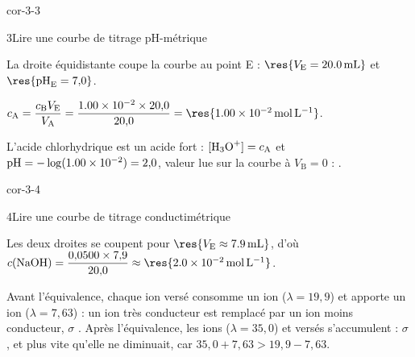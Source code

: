 \begin{blocLivre}{cor-3-3}
\begin{corrige}{3}{Lire une courbe de titrage pH-métrique}
\begin{questions}
\item La droite équidistante coupe la courbe au point E : $\res{V_\mathrm{E}=\qty{20,0}{mL}}$ et $\res{\pH_\mathrm{E}=7{,}0}$.
\item $c_\mathrm{A}=\dfrac{c_\mathrm{B}V_\mathrm{E}}{V_\mathrm{A}}=\dfrac{\num{1.00e-2}\times20{,}0}{20{,}0}=\res{\qty{1,00e-2}{mol.L^{-1}}}$.
\item L'acide chlorhydrique est un acide fort : $[\ce{H3O+}]=c_\mathrm{A}$ et $\mathrm{pH}=-\log(\num{1.00e-2})=2{,}0$, valeur
lue sur la courbe à $V_\mathrm{B}=0$ : .
\end{questions}
\end{corrige}
\end{blocLivre}
\begin{blocLivre}{cor-3-4}
\begin{corrige}{4}{Lire une courbe de titrage conductimétrique}
\begin{questions}
\item Les deux droites se coupent pour $\res{V_\mathrm{E}\approx\qty{7,9}{mL}}$, d'où
$c(\ce{NaOH})=\dfrac{0{,}0500\times7{,}9}{20{,}0}\approx\res{\qty{2,0e-2}{mol.L^{-1}}}$.
\item Avant l'équivalence, chaque ion  versé consomme un ion  ($\lambda=19{,}9$) et apporte un ion
 ($\lambda=7{,}63$) : un ion très conducteur est remplacé par un ion moins conducteur, $\sigma$
. Après l'équivalence, les ions  ($\lambda=35{,}0$) et  versés s'accumulent :
$\sigma$ , et plus vite qu'elle ne diminuait, car $35{,}0+7{,}63>19{,}9-7{,}63$.
\end{questions}
\end{corrige}
\end{blocLivre}
